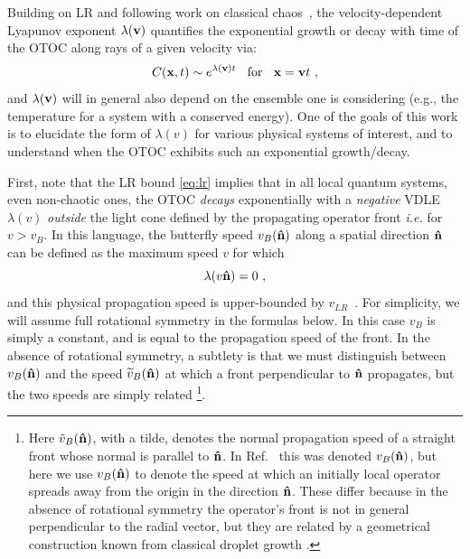 \documentclass[aps,prl,reprint,superscriptaddress, longbibliography]{revtex4-1}
\newcommand{\vb}{v_B}
\begin{document}
Building on LR and following work on classical chaos~\cite{Deissler1984,Kaneko1986,DeisslerKaneko}, the velocity-dependent Lyapunov exponent $\lambda({\bf v})$ quantifies the exponential growth or decay with time of the OTOC along rays of a given velocity via: 
\begin{equation}
C({\bf x},t) \sim e^{\lambda({\bf v}) t} \;\;  \mbox{ for } \;\; {\bf x} = {\bf v}t~, 
\label{eq:lamvdef}
\end{equation}
and $\lambda({\bf v})$ will in general also depend on the ensemble one is considering (e.g., the temperature for a system with a conserved energy).  
One of the goals of this work is to elucidate the form of $\lambda(v)$ for various physical systems of interest, and to understand when the OTOC exhibits such an exponential growth/decay. 

First, note that the LR bound \eqref{eq:lr} implies that in all local quantum systems, even non-chaotic ones, the OTOC \emph{decays} exponentially with a \emph{negative} VDLE $\lambda(v)$ \emph{outside} the light cone defined by the propagating operator front \emph{i.e.} for $v>\vb$.  
In this language, the butterfly speed $v_B({\bf \hat n})$ along a spatial direction ${\bf \hat n}$ can be defined as the maximum speed $v$ for which 
\begin{equation}
\lambda(v {\bf \hat n})=0~, 
\end{equation}
and this physical propagation speed  is upper-bounded by $v_{LR}$~\cite{RobertsSwingle}.
For simplicity, we will assume full rotational symmetry in the formulas below.
In this case $v_B$ is simply a constant, and is equal to the propagation speed of the front. 
In the absence of rotational symmetry, a subtlety is that  we must distinguish between $\vb({\bf \hat n})$ and the  speed $\widetilde v_B ({\bf \hat n})$ at which a front perpendicular to ${\bf \hat n}$ propagates, but the two speeds are simply related \footnote{Here $\tilde{v}_B({\bf \hat n})$, with a tilde, denotes the  normal propagation speed of a straight front whose normal is parallel to ${\bf \hat n}$. In Ref.~\cite{opspreadAdam} this was denoted $v_B({\bf \hat n})$, but here we use $v_B({\bf \hat n})$ to denote the speed at which  an
initially local operator spreads away from the origin in the direction ${\bf \hat n}$. These differ because  in the absence of rotational symmetry the operator's front is not in general perpendicular to the radial vector, but they are related by a geometrical construction known from classical droplet growth  \cite{WolfWulff, krug1991solids,opspreadAdam}.}.
\end{document}
